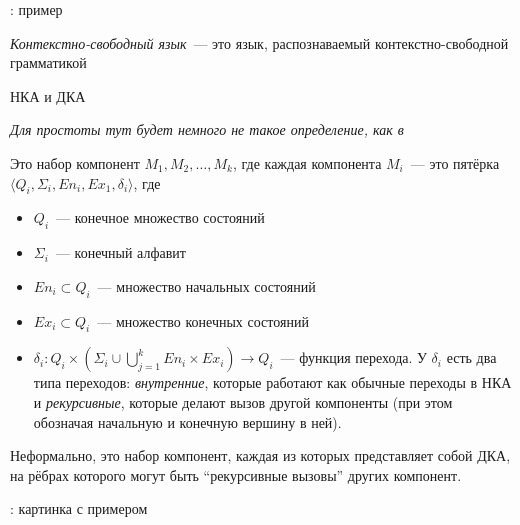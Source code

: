\begin{example}
\TODO: пример
\end{example}

\begin{definition}
\textit{Контекстно-свободный язык}~--- это язык, распознаваемый контекстно-свободной грамматикой
\end{definition}

\begin{definition}
    НКА и ДКА
    
\end{definition}

\begin{definition}
    \textit{Для простоты тут будет немного не такое определение, как в~\cite{Alur05}}

    Это набор компонент $M_1, M_2, \dots , M_k$, где каждая компонента $M_i$~--- это пятёрка $\langle Q_i, \Sigma_i, En_i, Ex_1, \delta_i \rangle$, где 
        \begin{itemize}
            \item $Q_i$~--- конечное множество состояний
            \item $\Sigma_i$~--- конечный алфавит
            \item $En_i \subset Q_i$~--- множество начальных состояний
            \item $Ex_i \subset Q_i$~--- множество конечных состояний
            \item $\delta_i \colon Q_i \times (\Sigma_i \cup \bigcup\limits_{j = 1}^k En_i \times Ex_i ) \to Q_i$~--- функция перехода. У $\delta_i$ есть два типа переходов: \textit{внутренние}, которые работают как обычные переходы в НКА и \textit{рекурсивные}, которые делают вызов другой компоненты (при этом обозначая начальную и конечную вершину в ней).
        \end{itemize}

    Неформально, это набор компонент, каждая из которых представляет собой ДКА, на рёбрах которого могут быть ``рекурсивные вызовы'' других компонент.

    \TODO: картинка с примером
    
\end{definition}

\begin{definition}

\TODO

\end{definition}

